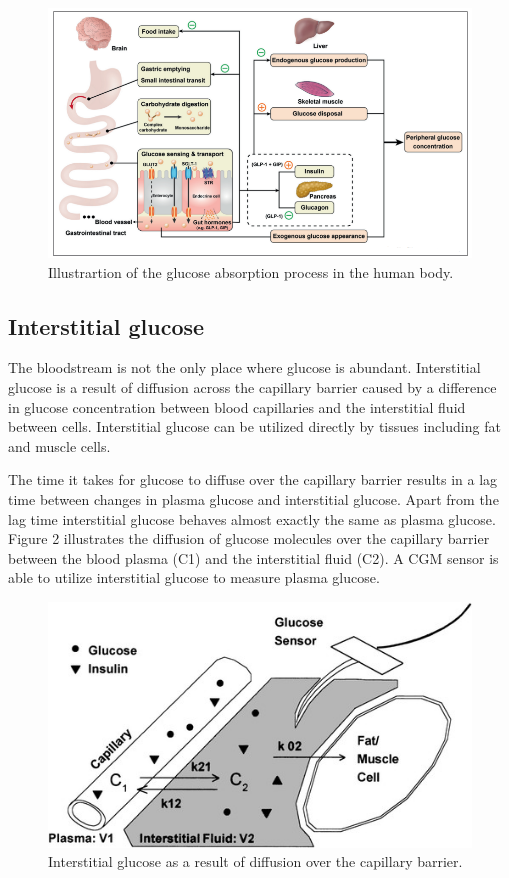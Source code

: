 \documentclass[english, 12pt, a4paper, elec, utf8, a-1b, online]{aaltothesis}
\begin{document}
\begin{figure}[H]
\centering
\includegraphics[width=14cm]{images/glucose_absorption.png}
\caption{Illustrartion of the glucose absorption process in the human body\cite{glucose_absorption}.}
\end{figure}

\subsection{Interstitial glucose}
The bloodstream is not the only place where glucose is abundant. Interstitial glucose is a result of diffusion across the capillary 
barrier caused by a difference in glucose concentration between blood capillaries and the interstitial fluid between cells\cite{rebrin_can_2000}. Interstitial glucose can be utilized 
directly by tissues including fat and muscle cells\cite{interstitial_glucose}. 

The time it takes for glucose to diffuse over the capillary barrier results in a lag time between changes in plasma glucose and interstitial
glucose. Apart from the lag time interstitial glucose behaves almost exactly the same as plasma glucose\cite{cengiz_tale_2009}. Figure 2 illustrates the diffusion of 
glucose molecules over the capillary barrier between the blood plasma (C1) and the interstitial fluid (C2). A CGM sensor is able to utilize interstitial glucose to measure plasma glucose. 


\begin{figure}[H]
\centering
\includegraphics[width=14cm]{images/interstitial_glucose.jpeg}
\caption{Interstitial glucose as a result of diffusion over the capillary barrier\cite{interstitial_glucose}.}
\end{figure}
\end{document}
